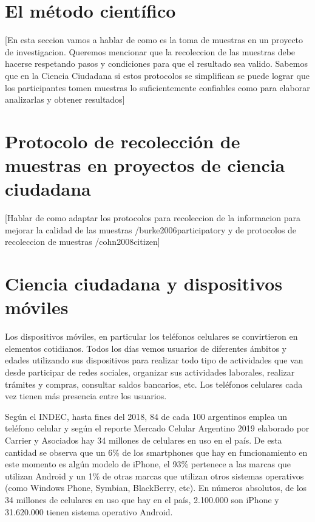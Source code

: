 \section{El método científico}
     [En esta seccion vamos a hablar de como es la toma de muestras en un proyecto de investigacion. Queremos mencionar que la recoleccion de las muestras debe hacerse respetando pasos y condiciones para que el resultado sea valido. Sabemos que en la Ciencia Ciudadana si estos protocolos se simplifican se puede lograr que los participantes tomen muestras lo suficientemente confiables como para elaborar analizarlas y obtener resultados]

\section{Protocolo de recolección de muestras en proyectos de ciencia ciudadana}

     [Hablar de como adaptar los protocolos para recoleccion de la informacion para mejorar la calidad de las muestras /burke2006participatory y de protocolos de recoleccion de muestras /cohn2008citizen]


	
\section{Ciencia ciudadana y dispositivos móviles}

	Los dispositivos móviles, en particular los teléfonos celulares se convirtieron en elementos cotidianos. Todos los días vemos usuarios de diferentes ámbitos y edades utilizando sus dispositivos para realizar todo tipo de actividades que van desde participar de redes sociales, organizar sus actividades laborales, realizar trámites y compras, consultar saldos bancarios, etc. Los teléfonos celulares cada vez tienen más presencia entre los usuarios. 
	
	Según el INDEC, hasta fines del 2018, 84 de cada 100 argentinos emplea un teléfono celular \cite{INDEC} y según el reporte Mercado Celular Argentino 2019 elaborado por Carrier y Asociados hay 34 millones de celulares en uso en el país. De esta cantidad se observa que un 6\% de los smartphones que hay en funcionamiento en este momento es algún modelo de iPhone, el 93\% pertenece a las marcas que utilizan Android y un 1\% de otras marcas que utilizan otros sistemas operativos (como Windows Phone, Symbian, BlackBerry, etc). En números absolutos, de los 34 millones de celulares en uso que hay en el país, 2.100.000 son iPhone y 31.620.000 tienen sistema operativo Android. \cite{carrier}	
		
